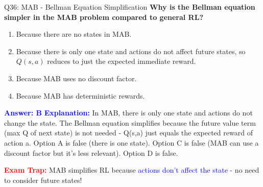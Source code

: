 \documentclass[8pt]{beamer}
\begin{document}
	\begin{frame}{Q36: MAB - Bellman Equation Simplification}
		\fontsize{6.5}{7.5}\selectfont
		\textbf{Why is the Bellman equation simpler in the MAB problem compared to general RL?}
		
		\begin{enumerate}
			\item Because there are no states in MAB.
			\item Because there is only one state and actions do not affect future states, so $Q(s,a)$ reduces to just the expected immediate reward.
			\item Because MAB uses no discount factor.
			\item Because MAB has deterministic rewards.
		\end{enumerate}
		
		\vspace{0.1cm}
		\textcolor{blue}{\textbf{Answer: B}}
		\vspace{0.1cm}
		\textcolor{blue}{\textbf{Explanation:}} In MAB, there is only one state and actions do not change the state. The Bellman equation simplifies because the future value term (max Q of next state) is not needed - Q(s,a) just equals the expected reward of action a. Option A is false (there is one state). Option C is false (MAB can use a discount factor but it's less relevant). Option D is false.
		
		\textcolor{red}{\textbf{Exam Trap:}} MAB simplifies RL because \textcolor{blue}{actions don't affect the state} - no need to consider future states!
	\end{frame}
	
\end{document}
